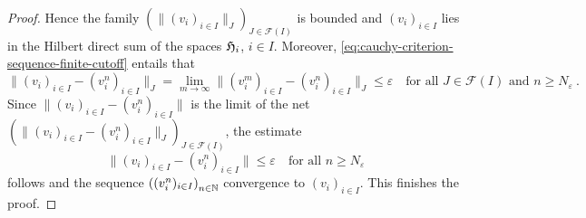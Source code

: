 \begin{proof}
  Hence the family $\left(\big\| (v_i)_{i\in I} \big\|_J\right)_{J\in \mathscr{F}(I)}$
  is bounded and $(v_i)_{i\in I}$ lies in the Hilbert direct sum of the spaces $\mathfrak{H}_i$, $i\in I$. 
  Moreover, \eqref{eq:cauchy-criterion-sequence-finite-cutoff} entails that
  \[
    \big\| (v_i)_{i\in I} - (v_i^n)_{i\in I} \big\|_J =
    \lim_{m\to \infty} \big\| (v_i^m)_{i\in I} - (v_i^n)_{i\in I} \big\|_J \leq \varepsilon \quad
    \text{for all } J\in \mathscr{F}(I) \text{ and }  n\geq N_\varepsilon \ . 
  \] 
  Since $\big\| (v_i)_{i\in I} - (v_i^n)_{i\in I} \big\|$ is the limit of the
  net $\left(\big\| (v_i)_{i\in I} - (v_i^n)_{i\in I} \big\|_J\right)_{J\in\mathscr{F}(I)}$,
  the estimate 
  \[
    \big\| (v_i)_{i\in I} - (v_i^n)_{i\in I} \big\| \leq \varepsilon \quad
    \text{for all }  n\geq N_\varepsilon 
  \]
  follows and the sequence $\left((v_i^n)_{i\in I} \right)_{n\in \mathbb{N}}$ convergence to
  $(v_i)_{i\in I}$. This finishes the proof.    
\end{proof}